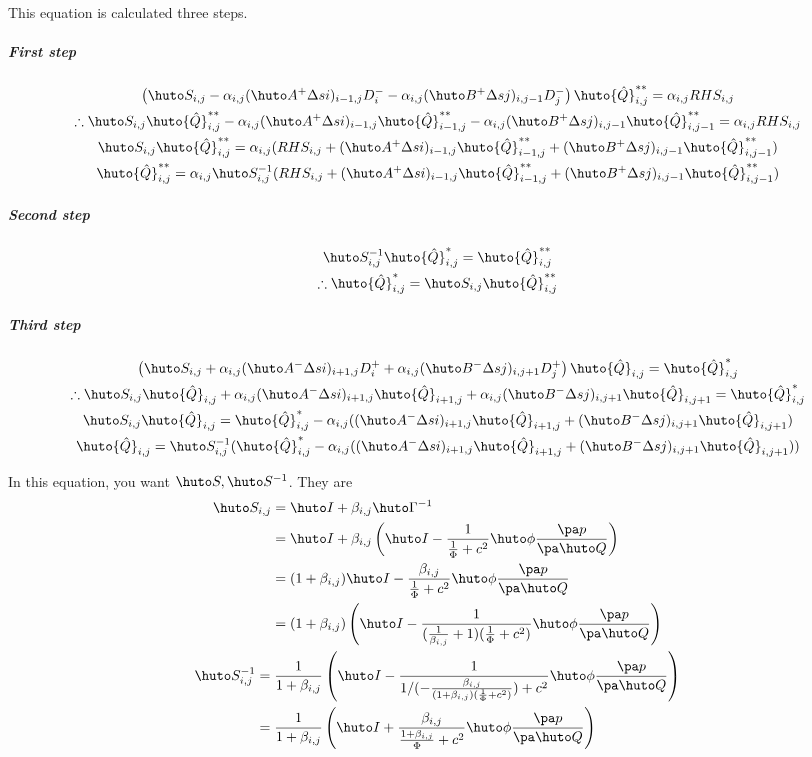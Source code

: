 \documentclass{jsarticle}
\newcommand{\bQ}{\huto Q}
\newcommand{\bhQ}{\huto{\hat Q}}
\newcommand{\bI}{\huto I}
\newcommand{\bA}{\huto A}
\newcommand{\bB}{\huto B}
\newcommand{\bS}{\huto S}
\newcommand{\bG}{\huto \Gamma}
\newcommand{\bp}{\huto \phi}
\begin{document}
This equation is calculated three steps.
\subparagraph{First step}
\begin{gather}
\left( \bS_{i,j} -\alpha_{i,j}(\bA^+\Delta si)_{i-1,j}D_i^- -\alpha_{i,j}(\bB^+\Delta sj)_{i,j-1}D_j^-\right) \bhQ ^{**}_{i,j}=\alpha_{i,j}RHS_{i,j}\\
\therefore \bS_{i,j}\bhQ ^{**}_{i,j} -\alpha_{i,j}(\bA^+\Delta si)_{i-1,j}\bhQ ^{**}_{i-1,j} -\alpha_{i,j}(\bB^+\Delta sj)_{i,j-1}\bhQ ^{**}_{i,j-1}=\alpha_{i,j}RHS_{i,j}\\
\bS_{i,j}\bhQ ^{**}_{i,j} =\alpha_{i,j}(RHS_{i,j}+(\bA^+\Delta si)_{i-1,j}\bhQ ^{**}_{i-1,j} +(\bB^+\Delta sj)_{i,j-1}\bhQ ^{**}_{i,j-1})\\
\bhQ ^{**}_{i,j} = \alpha_{i,j}\bS_{i,j}^{-1}(RHS_{i,j}+(\bA^+\Delta si)_{i-1,j}\bhQ ^{**}_{i-1,j} +(\bB^+\Delta sj)_{i,j-1}\bhQ ^{**}_{i,j-1})
\end{gather}
\subparagraph{Second step}
\begin{gather}
\bS_{i,j}^{-1}\bhQ ^*_{i,j}=\bhQ ^{**}_{i,j}\\
\therefore \bhQ ^*_{i,j}=\bS_{i,j}\bhQ ^{**}_{i,j}
\end{gather}
\subparagraph{Third step}
\begin{gather}
\left( \bS_{i,j} +\alpha_{i,j}(\bA^-\Delta si)_{i+1,j}D_i^+ +\alpha_{i,j} (\bB^-\Delta sj)_{i,j+1}D_j^+\right) \bhQ _{i,j}=\bhQ ^*_{i,j}\\
\therefore \bS_{i,j} \bhQ _{i,j} +\alpha_{i,j}(\bA^-\Delta si)_{i+1,j}\bhQ _{i+1,j} +\alpha_{i,j} (\bB^-\Delta sj)_{i,j+1}\bhQ _{i,j+1}=\bhQ ^*_{i,j}\\
\bS_{i,j} \bhQ _{i,j} =\bhQ ^*_{i,j}-\alpha_{i,j}((\bA^-\Delta si)_{i+1,j}\bhQ _{i+1,j} +(\bB^-\Delta sj)_{i,j+1}\bhQ _{i,j+1})\\
\bhQ _{i,j} =\bS^{-1}_{i,j}(\bhQ ^*_{i,j}-\alpha_{i,j}((\bA^-\Delta si)_{i+1,j}\bhQ _{i+1,j} +(\bB^-\Delta sj)_{i,j+1}\bhQ _{i,j+1}))
\end{gather}

In this equation, you want $\bS, \bS^{-1}$. They are
\begin{gather}
\begin{split}
\bS_{i,j} &= \bI +\beta _ {i,j}\bG ^{-1}\\
          &= \bI +\beta _ {i,j}\left( \bI -\frac{1}{\frac 1 \Phi+c^2}\bp \frac{\pa p}{\pa \bQ} \right)\\
          &= (1+\beta _{i,j})\bI -\frac{\beta _ {i,j}}{\frac 1 \Phi+c^2}\bp \frac{\pa p}{\pa \bQ}\\
          &= (1+\beta _{i,j})\left( \bI -\frac{1}{(\frac{1}{\beta _{i,j}}+1)(\frac 1 \Phi+c^2)}\bp \frac{\pa p}{\pa \bQ}\right)
\end{split}\\
\begin{split}
\bS_{i,j}^{-1} &=\frac{1}{1+\beta _{i,j}} \left( \bI -\frac{1}{1/(-\frac{\beta _ {i,j}}{(1+\beta _{i,j})(\frac 1 \Phi+c^2)})+c^2} \bp \frac{\pa p}{\pa \bQ}\right)\\
               &=\frac{1}{1+\beta _{i,j}} \left( \bI +\frac{\beta _ {i,j}}{\frac{1+\beta _ {i,j}} \Phi+c^2} \bp \frac{\pa p}{\pa \bQ}\right)
\end{split}
\end{gather}
\end{document}
